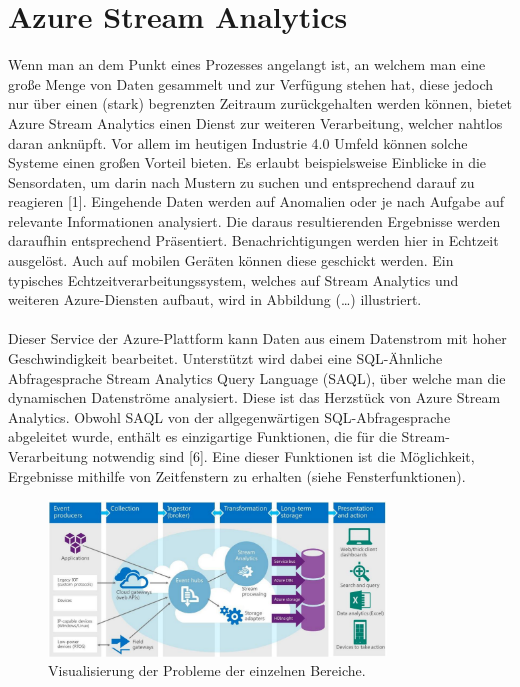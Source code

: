 \section{Azure Stream Analytics}
Wenn man an dem Punkt eines Prozesses angelangt ist, an welchem man eine große Menge von Daten gesammelt und zur Verfügung stehen hat, diese jedoch nur über einen (stark) begrenzten Zeitraum zurückgehalten werden können, bietet Azure Stream Analytics einen Dienst zur weiteren Verarbeitung, welcher nahtlos daran anknüpft. Vor allem im heutigen Industrie 4.0 Umfeld können solche Systeme einen großen Vorteil bieten. Es erlaubt beispielsweise Einblicke in die Sensordaten, um darin nach Mustern zu suchen und entsprechend darauf zu reagieren [1]. Eingehende Daten werden auf Anomalien oder je nach Aufgabe auf relevante Informationen analysiert. Die daraus resultierenden Ergebnisse werden daraufhin entsprechend Präsentiert. Benachrichtigungen werden hier in Echtzeit ausgelöst. Auch auf mobilen Geräten können diese geschickt werden. Ein typisches Echtzeitverarbeitungssystem, welches auf Stream Analytics und weiteren Azure-Diensten aufbaut, wird in Abbildung (…) illustriert.\\ \\
Dieser Service der Azure-Plattform kann Daten aus einem Datenstrom mit hoher Geschwindigkeit bearbeitet. Unterstützt wird dabei eine SQL-Ähnliche Abfragesprache Stream Analytics Query Language (SAQL), über welche man die dynamischen Datenströme analysiert. Diese ist das Herzstück von Azure Stream Analytics. Obwohl SAQL von der allgegenwärtigen SQL-Abfragesprache abgeleitet wurde, enthält es einzigartige Funktionen, die für die Stream-Verarbeitung notwendig sind [6]. Eine dieser Funktionen ist die Möglichkeit, Ergebnisse mithilfe von Zeitfenstern zu erhalten (siehe Fensterfunktionen). 
\begin{figure}[ht]
	\centering
	\includegraphics[width=0.8\textwidth,]{images/StreamAnalytics}
	\caption{Visualisierung der Probleme der einzelnen Bereiche\cite{Laukkanen.2017}.}
	\label{studie}
\end{figure}
